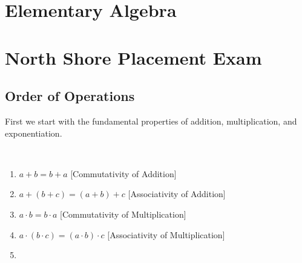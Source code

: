 \documentclass[crop=false,class=article,oneside]{standalone}
\begin{document}
    \ifx\ifmathcourseselementaryalgebra\undefined
        \section*{Elementary Algebra}
        \setcounter{section}{1}
    \else
        \section{North Shore Placement Exam}
    \fi
    \subsection{Order of Operations}
        First we start with the fundamental properties of
        addition, multiplication, and exponentiation.
        \begin{properties}
            \label{property:North_Shore_Arithmetic_Properties}
            \
            \begin{enumerate}
                \item
                    \label{%
                        property:%
                        North_Shore_Arithmetic_Properties_%
                        Com_Add%
                    }
                    $a+b=b+a$\hfill
                    [Commutativity of Addition]
                \item
                    \label{
                        property:%
                        north_shore_arithmetic_properties_%
                        assoc_add%
                    }
                    $a+(b+c)=(a+b)+c$\hfill
                    [Associativity of Addition]
                \item
                    \label{%
                        property:%
                        north_shore_arithmetic_properties_%
                        comm_mult%
                    }
                    ${a}\cdot{b}={b}\cdot{a}$\hfill
                    [Commutativity of Multiplication]
                \item
                    \label{%
                        property:%
                        north_shore_arithmetic_properties_%
                        assoc_mult%
                    }
                    ${a}\cdot{({b}\cdot{c})}%
                     ={({a}\cdot{b})}\cdot{c}$\hfill
                    [Associativity of Multiplication]
                \item
                    \label{%
                        property:%
                        north_shore_arithmetic_properties_%
}
\end{enumerate}
\end{properties}
\end{document}
